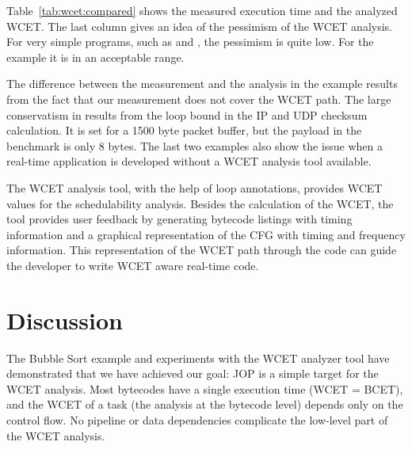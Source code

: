 Table~\ref{tab:wcet:compared} shows the measured execution time and
the analyzed WCET. The last column gives an idea of the pessimism of
the WCET analysis. For very simple programs, such as  and
, the pessimism is quite low. For the 
example it is in an acceptable range.
%
\begin{table}
    \caption{Measured and estimated WCETs with results in clock cycles}
    \label{tab:wcet:compared}
\end{table}
%
The difference between the measurement and the analysis in the
 example results from the fact that our measurement does
not cover the WCET path. The large conservatism in 
results from the loop bound in the IP and UDP checksum calculation.
It is set for a 1500 byte packet buffer, but the payload in the
benchmark is only 8 bytes. The last two examples also show the issue
when a real-time application is developed without a WCET analysis
tool available.

The WCET analysis tool, with the help of loop annotations, provides
WCET values for the schedulability analysis. Besides the calculation
of the WCET, the tool provides user feedback by generating bytecode
listings with timing information and a graphical representation of
the CFG with timing and frequency information. This representation of
the WCET path through the code can guide the developer to write WCET
aware real-time code.

\section{Discussion}

The Bubble Sort example and experiments with the WCET analyzer tool
have demonstrated that we have achieved our goal: JOP is a simple
target for the WCET analysis. Most bytecodes have a single execution
time (WCET = BCET), and the WCET of a task (the analysis at the
bytecode level) depends only on the control flow. No pipeline or
data dependencies complicate the low-level part of the WCET
analysis.


